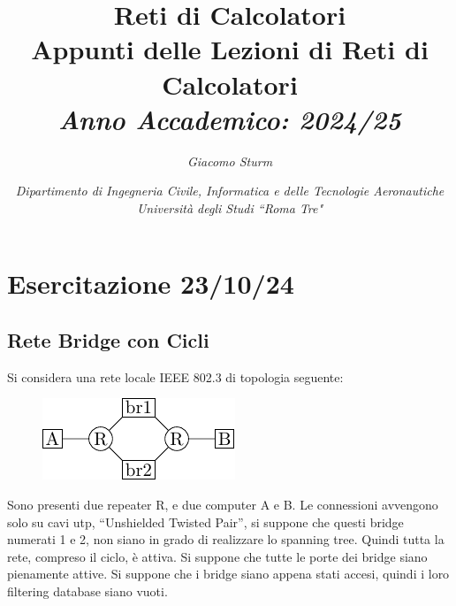 \documentclass{article}
\numberwithin{equation}{subsection}
\begin{document}
\title{%
    \textbf{Reti di Calcolatori}  \\ 
    \large Appunti delle Lezioni di Reti di Calcolatori \\
    \textit{Anno Accademico: 2024/25}}
\author{\textit{Giacomo Sturm}}
\date{\textit{Dipartimento di Ingegneria Civile, Informatica e delle Tecnologie Aeronautiche \\
Università degli Studi ``Roma Tre"}}

\maketitle
\thispagestyle{link}

\clearpage


\pagestyle{fancy}
\fancyhead{}\fancyfoot{}
\fancyfoot[C]{\thepage}

\tableofcontents

\clearpage
{}

\section{Esercitazione 23/10/24}

\subsection{Rete Bridge con Cicli}

Si considera una rete locale IEEE 802.3 di topologia seguente:

\begin{figure}[H]%
    \centering%
    \includegraphics[scale=1.25]{rete_bridge_cicli.pdf}%
\end{figure}

Sono presenti due repeater R, e due computer A e B. Le connessioni avvengono solo su cavi utp, ``Unshielded Twisted Pair'', si suppone che questi 
bridge numerati 1 e 2, non siano in grado di realizzare lo spanning tree. Quindi tutta la rete, compreso il ciclo, è attiva. Si suppone che tutte 
le porte dei bridge siano pienamente attive. 
Si suppone che i bridge siano appena stati accesi, quindi i loro filtering database siano vuoti. 
\end{document}
